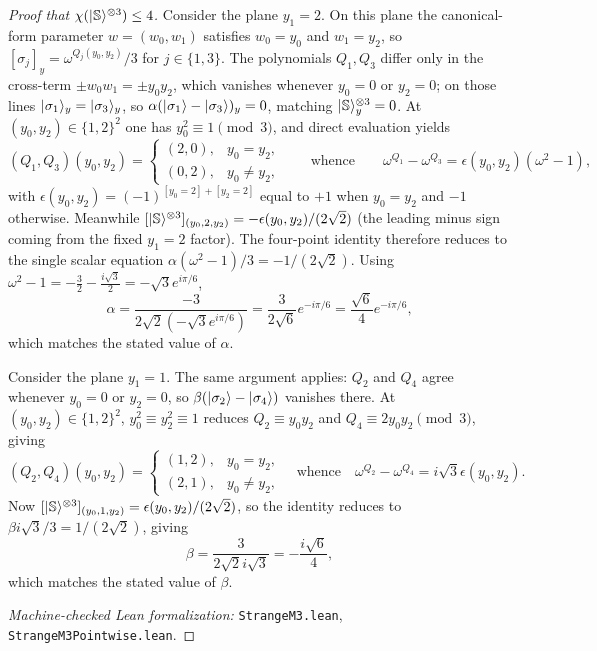 \documentclass[11pt]{article}
\theoremstyle{definition}
\newcommand{\microspace}{\mspace{0.5mu}}
\newcommand{\ket}[1]{\lvert\microspace #1 \microspace \rangle}
\newcommand{\chiR}{\chi}
\newcommand{\Strange}{\ket{\mathbb{S}}}
\begin{document}
\begin{proof}[Proof that $\chiR(\Strange^{\otimes 3}) \le 4$]
		Consider the plane $y_1 = 2$. On this plane the canonical-form
		parameter $w = (w_0, w_1)$ satisfies $w_0 = y_0$ and $w_1 = y_2$,
		so $[\sigma_j]_y = \omega^{Q_j(y_0, y_2)} / 3$ for $j \in \{1, 3\}$.
		The polynomials $Q_1, Q_3$ differ only in the cross-term
		$\pm w_0 w_1 = \pm y_0 y_2$, which vanishes whenever $y_0 = 0$ or
		$y_2 = 0$; on those lines
		$\ket{\sigma_1}_y = \ket{\sigma_3}_y$, so $\alpha (\ket{\sigma_1} - \ket{\sigma_3})_y = 0$,
		matching $\Strange^{\otimes 3}_y = 0$. At $(y_0, y_2) \in \{1, 2\}^2$
		one has $y_0^2 \equiv 1 \pmod 3$, and direct evaluation yields
		\begin{equation}
			(Q_1, Q_3)(y_0, y_2) =
			\begin{cases}
				(2, 0), & y_0 = y_2, \\
				(0, 2), & y_0 \neq y_2,
			\end{cases}
			\qquad \text{whence} \qquad
			\omega^{Q_1} - \omega^{Q_3} = \epsilon(y_0, y_2)  (\omega^2 - 1),
		\end{equation}
		with $\epsilon(y_0, y_2) = (-1)^{[y_0 = 2] + [y_2 = 2]}$ equal to $+1$
		when $y_0 = y_2$ and $-1$ otherwise. Meanwhile
		$[\Strange^{\otimes 3}]_{(y_0, 2, y_2)} = -\epsilon(y_0, y_2) / (2 \sqrt 2)$
		(the leading minus sign coming from the fixed $y_1 = 2$ factor). The
		four-point identity therefore reduces to the single scalar equation
		$\alpha (\omega^2 - 1) / 3 = -1 / (2 \sqrt 2)$. Using
		$\omega^2 - 1 = -\frac{3}{2} - \frac{i \sqrt 3}{2} = -\sqrt 3  e^{i \pi / 6}$,
		\begin{equation}
			\alpha
			= \frac{-3}{2 \sqrt 2 (-\sqrt 3  e^{i \pi / 6})}
			= \frac{3}{2 \sqrt 6}  e^{-i \pi / 6}
			= \frac{\sqrt 6}{4}  e^{-i \pi / 6},
		\end{equation}
		which matches the stated value of $\alpha$.
		
		Consider the plane $y_1 = 1$. The same argument applies: $Q_2$ and $Q_4$ agree whenever $y_0 = 0$ or
		$y_2 = 0$, so $\beta(\ket{\sigma_2} - \ket{\sigma_4})$ vanishes there. At
		$(y_0, y_2) \in \{1, 2\}^2$, $y_0^2 \equiv y_2^2 \equiv 1$ reduces
		$Q_2 \equiv y_0 y_2$ and $Q_4 \equiv 2 y_0 y_2 \pmod 3$, giving
		\begin{equation}
			(Q_2, Q_4)(y_0, y_2) =
			\begin{cases}
				(1, 2), & y_0 = y_2, \\
				(2, 1), & y_0 \neq y_2,
			\end{cases}
			\quad \text{whence} \quad
			\omega^{Q_2} - \omega^{Q_4} = i \sqrt 3  \epsilon(y_0, y_2).
		\end{equation}
		Now $[\Strange^{\otimes 3}]_{(y_0, 1, y_2)} = \epsilon(y_0, y_2) / (2 \sqrt 2)$,
		so the identity reduces to $\beta  i \sqrt 3 / 3 = 1 / (2 \sqrt 2)$,
		giving
		\begin{equation}
			\beta = \frac{3}{2 \sqrt 2 i \sqrt 3}
			= -\frac{i \sqrt 6}{4},
		\end{equation}
		which matches the stated value of $\beta$.

		\textit{Machine-checked Lean formalization:}
		\texttt{StrangeM3.lean},
		\texttt{StrangeM3Pointwise.lean}.
	\end{proof}
	
\end{document}
